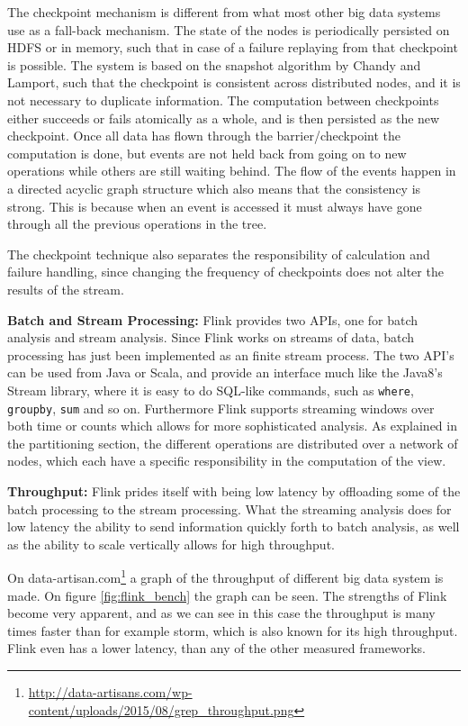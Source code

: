 The checkpoint mechanism is different from what most other big data systems use as a fall-back mechanism. The state of the nodes is periodically persisted on HDFS or in memory, such that in case of a failure replaying from that checkpoint is possible. The system is based on the snapshot algorithm by Chandy and Lamport\cite{data-artisan-flink}, such that the checkpoint is consistent across distributed nodes, and it is not necessary to duplicate information. The computation between checkpoints either succeeds or fails atomically as a whole, and is then persisted as the new checkpoint. Once all data has flown through the barrier/checkpoint the computation is done, but events are not held back from going on to new operations while others are still waiting behind. The flow of the events happen in a directed acyclic graph structure which also means that the consistency is strong. This is because when an event is accessed it must always have gone through all the previous operations in the tree\cite{data-artisan-flink}.

The checkpoint technique also separates the responsibility of calculation and failure handling, since changing the frequency of checkpoints does not alter the results of the stream.

\newpar \textbf{Batch and Stream Processing:} Flink provides two APIs, one for batch analysis and stream analysis. Since Flink works on streams of data, batch processing has just been implemented as an finite stream process. The two API's can be used from Java or Scala, and provide an interface much like the Java8's Stream library, where it is easy to do SQL-like commands, such as \texttt{where}, \texttt{groupby}, \texttt{sum} and so on. Furthermore Flink supports streaming windows over both time or counts which allows for more sophisticated analysis. As explained in the partitioning section, the different operations are distributed over a network of nodes, which each have a specific responsibility in the computation of the view. 

\newpar \textbf{Throughput:} Flink prides itself with being low latency by offloading some of the batch processing to the stream processing. What the streaming analysis does for low latency the ability to send information quickly forth to batch analysis, as well as the ability to scale vertically allows for high throughput. 

On data-artisan.com\footnote{ \url{http://data-artisans.com/wp-content/uploads/2015/08/grep_throughput.png}} a graph of the throughput of different big data system is made. On figure \ref{fig:flink_bench} the graph can be seen. The strengths of Flink become very apparent, and as we can see in this case the throughput is many times faster than for example storm, which is also known for its high throughput. Flink even has a lower latency, than any of the other measured frameworks.

